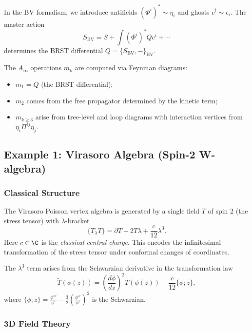 In the BV formalism, we introduce antifields $(\Phi^i)^* \sim \eta_i$ and ghosts $c^i \sim \epsilon_i$. The master action
\[
S_{\text{BV}} = S + \int (\Phi^i)^* Q c^i + \cdots
\]
determines the BRST differential $Q = \{S_{\text{BV}}, -\}_{\text{BV}}$.

The $A_\infty$ operations $m_k$ are computed via Feynman diagrams:
\begin{itemize}
\item $m_1 = Q$ (the BRST differential);
\item $m_2$ comes from the free propagator determined by the kinetic term;
\item $m_{k \geq 3}$ arise from tree-level and loop diagrams with interaction vertices from $\eta_i \Pi^{ij} \eta_j$.
\end{itemize}

\subsection{Example 1: Virasoro Algebra (Spin-2 W-algebra)}

\subsubsection{Classical Structure}

The Virasoro Poisson vertex algebra is generated by a single field $T$ of spin 2 (the stress tensor) with $\lambda$-bracket
\begin{equation}
\{T_\lambda T\} = \partial T + 2T\lambda + \frac{c}{12}\lambda^3.
\end{equation}
Here $c \in \C$ is the \emph{classical central charge}. This encodes the infinitesimal transformation of the stress tensor under conformal changes of coordinates.

\begin{remark}
The $\lambda^3$ term arises from the Schwarzian derivative in the transformation law
\[
\tilde{T}(\phi(z)) = \left(\frac{d\phi}{dz}\right)^2 T(\phi(z)) - \frac{c}{12}\{\phi; z\},
\]
where $\{\phi; z\} = \frac{\phi'''}{\phi'} - \frac{3}{2}\left(\frac{\phi''}{\phi'}\right)^2$ is the Schwarzian.
\end{remark}

\subsubsection{3D Field Theory}

